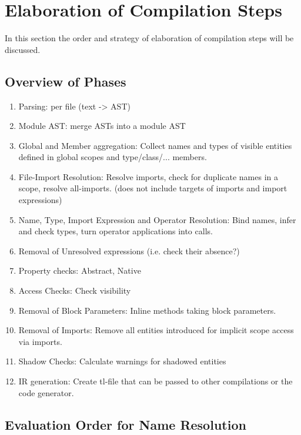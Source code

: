 \section{Elaboration of Compilation Steps}

In this section the order and strategy of elaboration of compilation steps will be discussed.

\subsection{Overview of Phases}

\begin{enumerate}
	\item Parsing: per file (text -> AST)
	\item Module AST: merge ASTs into a module AST
	\item Global and Member aggregation: Collect names and types of visible entities defined in global scopes and type/class/... members.
    \item File-Import Resolution: Resolve imports, check for duplicate names in a scope, resolve all-imports. (does not include targets of imports and import expressions)
	\item Name, Type, Import Expression and Operator Resolution: Bind names, infer and check types, turn operator applications into calls. 
    \item Removal of Unresolved expressions (i.e. check their absence?)
	\item Property checks: Abstract, Native
	\item Access Checks: Check visibility
	\item Removal of Block Parameters: Inline methods taking block parameters.
	\item Removal of Imports: Remove all entities introduced for implicit scope access via imports.
	\item Shadow Checks: Calculate warnings for shadowed entities
	\item IR generation: Create tl-file that can be passed to other compilations or the code generator.
\end{enumerate}

\subsection{Evaluation Order for Name Resolution}

